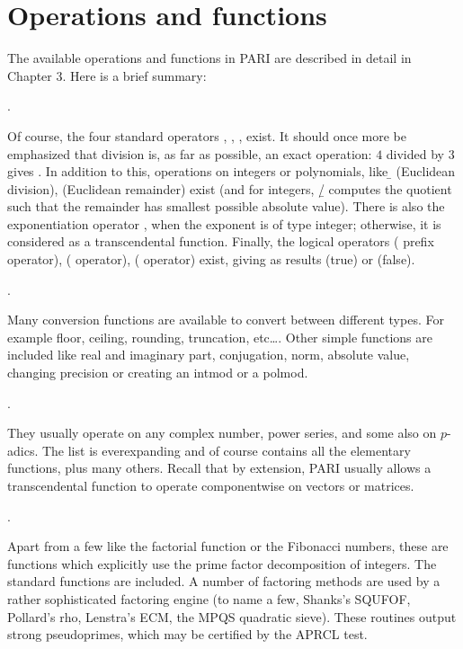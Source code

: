 \section{Operations and functions}

The available operations and functions in PARI are described in detail in
Chapter 3. Here is a brief summary:

.

\noindent
Of course, the four standard operators \kbd{+}, \kbd{-}, \kbd{*}, \kbd{/}
exist. It should once more be emphasized that division is, as far as possible,
an exact operation: $4$ divided by $3$ gives . In addition to
this, operations on integers or polynomials, like \b{} (Euclidean
division), \kbd{\%} (Euclidean remainder) exist (and for integers, {\b{/}}
computes the quotient such that the remainder has smallest possible absolute
value). There is also the exponentiation operator \kbd{\pow }, when the
exponent is of type integer; otherwise, it is considered as a transcendental
function. Finally, the logical operators \kbd{!} ( prefix operator),
\kbd{\&\&} ( operator), \kbd{||} ( operator) exist, giving
as results  (true) or  (false).

.

\noindent
Many conversion functions are available to convert between different types.
For example floor, ceiling, rounding, truncation, etc\dots. Other simple
functions are included like real and imaginary part, conjugation, norm,
absolute value, changing precision or creating an intmod or a polmod.

.

\noindent
They usually operate on any complex number, power series, and some also on
$p$-adics. The list is everexpanding and of course contains all the
elementary functions, plus many others. Recall that by extension, PARI
usually allows a transcendental function to operate componentwise on
vectors or matrices.

.

\noindent
Apart from a few like the factorial function or the Fibonacci numbers, these
are functions which explicitly use the prime factor decomposition of
integers. The standard functions are included. A number of factoring methods
are used by a rather sophisticated factoring engine (to name a few, Shanks's
SQUFOF, Pollard's rho, Lenstra's ECM, the MPQS quadratic sieve). These
routines output strong pseudoprimes, which may be certified by the APRCL
test.

